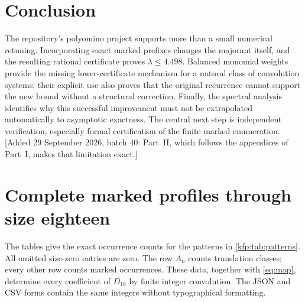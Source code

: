 \documentclass[11pt,a4paper]{article}
\theoremstyle{definition}
\theoremstyle{remark}
\begin{document}
\section{Conclusion}
\label{kfp:sec:conclusion}
The repository's polyomino project supports more than a small numerical
retuning. Incorporating exact marked prefixes changes the majorant itself,
and the resulting rational certificate proves $\lambda\leq4.498$.
Balanced monomial weights provide the missing lower-certificate mechanism
for a natural class of convolution systems; their explicit use also proves
that the original recurrence cannot support the new bound without a
structural correction. Finally, the spectral analysis identifies why this
successful improvement must not be extrapolated automatically to asymptotic
exactness. The central next step is independent verification, especially
formal certification of the finite marked enumeration.
[Added 29 September 2026, batch 40: Part~II, which follows the appendices
of Part~I, makes that limitation exact.]

\appendix
\clearpage
{}
\section{Complete marked profiles through size eighteen}
\label{kfp:app:data}

The tables give the exact occurrence counts for the patterns in
\cref{kfp:tab:patterns}. All omitted size-zero entries are zero. The row $A_n$
counts translation classes; every other row counts marked occurrences.
These data, together with \eqref{eq:map}, determine every coefficient of
$D_{18}$ by finite integer convolution. The JSON and CSV forms contain the
same integers without typographical formatting.

\begin{table}[H]
\centering\footnotesize
\setlength{\tabcolsep}{4pt}
\renewcommand{\arraystretch}{1.12}

\caption{Exact profiles for sizes $1$ through $9$.}
\end{table}

\begin{table}[H]
\centering\footnotesize
\setlength{\tabcolsep}{2.25pt}
\renewcommand{\arraystretch}{1.12}

\caption{Exact profiles for sizes $10$ through $18$.}
\end{table}
\clearpage
\end{document}
